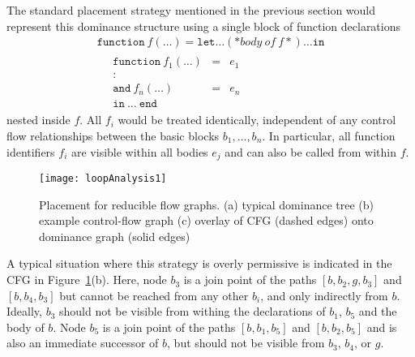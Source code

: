 The standard placement strategy mentioned in the previous section
would represent this dominance structure
using a single block of function declarations
\begin{equation}
\label{sec:SSA:functiondeclarationblock}
\begin{array}{l}
  \mathtt{function}\ f (\ldots)= 
  \mathtt{let} \ldots (* \mathit{body\ of\ f}*)\ldots \mathtt{in}\\
  \quad \begin{array}{rcl}
            \mathtt{function}\ f_1(\ldots) & = & e_1\\
             : \\
            \mathtt{and}\ f_n(\ldots) & = & e_n\\
            \mathtt{in}\ \ldots\ \mathtt{end}
        \end{array}
  \end{array}
\end{equation}
nested inside $f$. All $f_i$ would be treated identically, independent
of any control flow relationships between the basic blocks $b_1,
\ldots, b_n$. In particular, all function identifiers $f_i$ are
visible within all bodies $e_j$ and can also be called from within
$f$.

\begin{figure}
\begin{center}
\texttt{[image: loopAnalysis1]}
\end{center}
\caption{\label{FigLoopAnalysis1ReducibleGraph} Placement for reducible flow graphs. (a) typical dominance tree (b) example control-flow graph (c) overlay of CFG (dashed edges) onto dominance graph (solid edges) }
\end{figure}
A typical situation where this strategy is overly permissive is
indicated in the CFG in
Figure~\ref{FigLoopAnalysis1ReducibleGraph}(b). Here, node $b_3$ is a
join point of the paths $[b,b_2,g,b_3]$ and $[b,b_4,b_3]$ but cannot
be reached from any other $b_i$, and only indirectly from $b$.
Ideally, $b_3$ should not be visible from withing the declarations of
$b_1$, $b_5$ and the body of $b$. Node $b_5$ is a join point of the
paths $[b,b_1,b_5]$ and $[b,b_2,b_5]$ and is also an immediate
successor of $b$, but should not be visible from $b_3$, $b_4$, or $g$.

